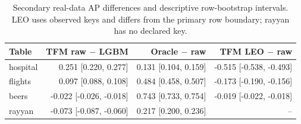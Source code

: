 \begin{table}[t]
\centering\small
\setlength{\tabcolsep}{3.5pt}
\caption{Secondary real-data AP differences and descriptive row-bootstrap intervals. LEO uses observed keys and differs from the primary row boundary; rayyan has no declared key.}
\label{tab:secondary}
\begin{tabular}{lrrr}
\toprule
Table & TFM raw $-$ LGBM & Oracle $-$ raw & TFM LEO $-$ raw \\
\midrule
hospital & 0.251 [0.220, 0.277] & 0.131 [0.104, 0.159] & -0.515 [-0.538, -0.493] \\
flights & 0.097 [0.088, 0.108] & 0.484 [0.458, 0.507] & -0.173 [-0.190, -0.156] \\
beers & -0.022 [-0.026, -0.018] & 0.743 [0.733, 0.754] & -0.019 [-0.022, -0.018] \\
rayyan & -0.073 [-0.087, -0.060] & 0.217 [0.200, 0.236] & -- \\
\bottomrule
\end{tabular}
\end{table}
